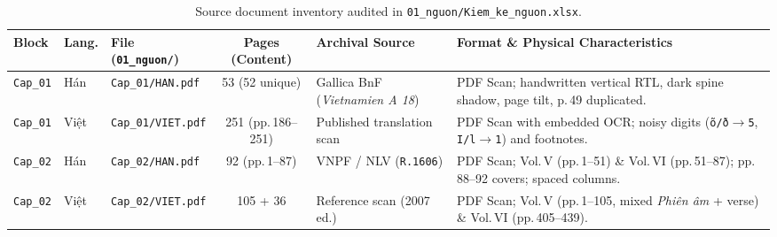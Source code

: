 \documentclass[a4paper]{article}
\begin{document}
\begin{table}[!htb]
\centering
\caption{Source document inventory audited in \texttt{01\_nguon/Kiem\_ke\_nguon.xlsx}.}
\label{tab:inventory}
\scriptsize
\renewcommand{\arraystretch}{1.08}
\begin{tabularx}{\textwidth}{@{}l l l c L{3.35cm} Y@{}}
\toprule
\textbf{Block} & \textbf{Lang.} & \textbf{File (\texttt{01\_nguon/})} & \textbf{Pages (Content)} & \textbf{Archival Source} & \textbf{Format \& Physical Characteristics} \\
\midrule
\texttt{Cap\_01} & Hán & \texttt{Cap\_01/HAN.pdf} & 53 (52 unique) & Gallica BnF (\textit{Vietnamien A 18}) & PDF Scan; handwritten vertical RTL, dark spine shadow, page tilt, p.\,49 duplicated. \\
\texttt{Cap\_01} & Việt & \texttt{Cap\_01/VIET.pdf} & 251 (pp.\,186--251) & Published translation scan & PDF Scan with embedded OCR; noisy digits (\texttt{õ/ð}$\to$\texttt{5}, \texttt{I/l}$\to$\texttt{1}) and footnotes. \\
\texttt{Cap\_02} & Hán & \texttt{Cap\_02/HAN.pdf} & 92 (pp.\,1--87) & VNPF / NLV (\texttt{R.1606}) & PDF Scan; Vol.\,V (pp.\,1--51) \& Vol.\,VI (pp.\,51--87); pp.\,88--92 covers; spaced columns. \\
\texttt{Cap\_02} & Việt & \texttt{Cap\_02/VIET.pdf} & 105 + 36 & Reference scan (2007 ed.) & PDF Scan; Vol.\,V (pp.\,1--105, mixed \textit{Phiên âm} + verse) \& Vol.\,VI (pp.\,405--439). \\
\bottomrule
\end{tabularx}
\end{table}

\vspace{-3pt}
\end{document}

